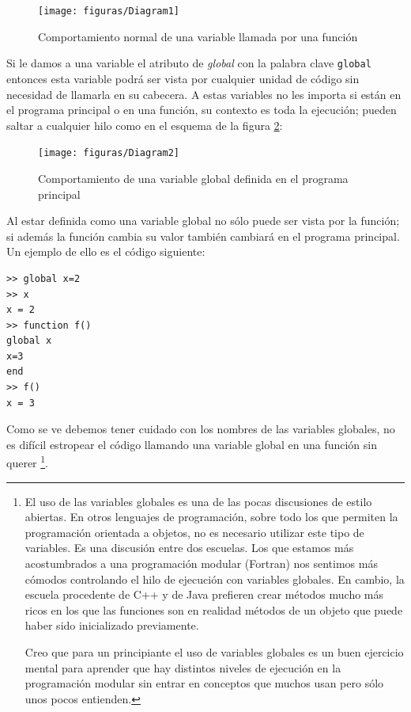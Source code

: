%
\begin{figure}[h]
  \centering{}\texttt{[image: figuras/Diagram1]}


  \caption{\label{cap:Comportamiento-normal-de}Comportamiento normal
    de una variable llamada por una función}
\end{figure}


Si le damos a una variable el atributo de \emph{global} con la palabra
clave \texttt{global} entonces esta variable podrá ser
vista por cualquier unidad de código sin necesidad de llamarla en su
cabecera. A estas variables no les importa si están en el programa
principal o en una función, su contexto es toda la ejecución; pueden
saltar a cualquier hilo como en el esquema de la figura
\ref{cap:Comprtamiento-de-una}:

%
\begin{figure}[h]
  \centering{}\texttt{[image: figuras/Diagram2]}


  \caption{\label{cap:Comprtamiento-de-una}Comportamiento de una
    variable global definida en el programa principal}
\end{figure}


Al estar definida como una variable global no sólo puede ser vista por
la función; si además la función cambia su valor también cambiará en
el programa principal. Un ejemplo de ello es el código siguiente:

\begin{lstlisting}
>> global x=2
>> x
x = 2
>> function f()
global x
x=3
end
>> f()
x = 3
\end{lstlisting}
Como se ve debemos tener cuidado con los nombres de las variables
globales, no es difícil estropear el código llamando una variable
global en una función sin querer%
\footnote{El uso de las variables globales es una de las pocas
  discusiones de estilo abiertas. En otros lenguajes de programación,
  sobre todo los que permiten la programación orientada a objetos, no
  es necesario utilizar este tipo de variables. Es una discusión entre
  dos escuelas.  Los que estamos más acostumbrados a una programación
  modular (Fortran) nos sentimos más cómodos controlando el hilo de
  ejecución con variables globales. En cambio, la escuela procedente
  de C++ y de Java prefieren crear métodos mucho más ricos en los que
  las funciones son en realidad métodos de un objeto que puede haber
  sido inicializado previamente.

  Creo que para un principiante el uso de variables globales es un
  buen ejercicio mental para aprender que hay distintos niveles de
  ejecución en la programación modular sin entrar en conceptos que
  muchos usan pero sólo unos pocos entienden.%
}.

